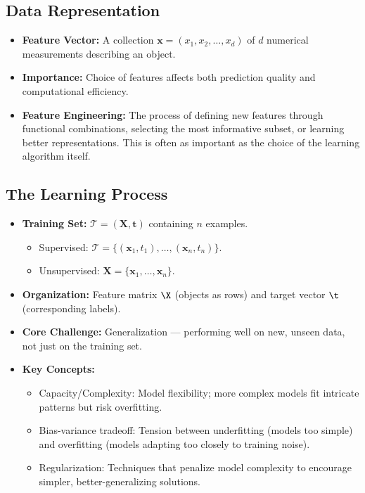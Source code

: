 \subsection*{Data Representation}
\begin{itemize}
    \item \textbf{Feature Vector:} A collection $\mathbf{x} = (x_1, x_2, \ldots, x_d)$ of $d$ numerical measurements describing an object.
    \item \textbf{Importance:} Choice of features affects both prediction quality and computational efficiency.
    \item \textbf{Feature Engineering:} The process of defining new features through functional combinations, selecting the most informative subset, or learning better representations. This is often as important as the choice of the learning algorithm itself.
\end{itemize}

\subsection*{The Learning Process}
\begin{itemize}
    \item \textbf{Training Set:} $\mathcal{T} = (\mathbf{X}, \mathbf{t})$ containing $n$ examples.
    \begin{itemize}
        \item Supervised: $\mathcal{T} = \{(\mathbf{x}_1, t_1), \ldots, (\mathbf{x}_n, t_n)\}$.
        \item Unsupervised: $\mathbf{X} = \{\mathbf{x}_1, \ldots, \mathbf{x}_n\}$.
    \end{itemize}
    \item \textbf{Organization:} Feature matrix $\X$ (objects as rows) and target vector $\t$ (corresponding labels).
    \item \textbf{Core Challenge:} \alert{Generalization} — performing well on new, unseen data, not just on the training set.
    \item \textbf{Key Concepts:}
    \begin{itemize}
        \item \alert{Capacity/Complexity}: Model flexibility; more complex models fit intricate patterns but risk overfitting.
        \item \alert{Bias-variance tradeoff}: Tension between underfitting (models too simple) and overfitting (models adapting too closely to training noise).
        \item \alert{Regularization}: Techniques that penalize model complexity to encourage simpler, better-generalizing solutions.
    \end{itemize}
\end{itemize}

